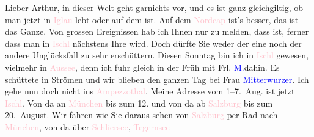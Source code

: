 \pstart
           Lieber Arthur, in dieser Welt geht garnichts vor, und
               es ist ganz gleichgiltig, ob man jetzt in \textcolor{pink}{Iglau}{}\ledrightnote{\textcolor{pink}{Jihlava}}
               lebt oder auf dem \label{K_L03175-1v}\label{K_L03175-1h} ist. Auf dem \textcolor{pink}{Nordcap}{}\ledrightnote{\textcolor{pink}{Nordkap}} ist’s besser, das ist das Ganze. Von
               grossen Ereignissen hab ich Ihnen nur zu melden, dass \label{K_L03175-2v}\label{K_L03175-2h} ist, ferner dass man in \textcolor{pink}{Ischl}{}\ledrightnote{\textcolor{pink}{Bad Ischl}} nächstens Ihre \label{K_L03175-3v}\label{K_L03175-3h} wird. Doch dürfte Sie weder der eine noch der andere Unglücksfall zu sehr
               erschüttern. Diesen Sonntag bin ich in \textcolor{pink}{Ischl}{}\ledrightnote{\textcolor{pink}{Bad Ischl}} gewesen, vielmehr in \textcolor{pink}{Aussee}{}\ledrightnote{\textcolor{pink}{Bad Aussee}}, denn ich fuhr gleich in der Früh mit Frl. \textcolor{blue}{M.}{}\ledrightnote{\textcolor{blue}{Ottilie Salten}}{ }{\pb}dahin. Es schüttete in
               Strömen und wir blieben den ganzen Tag bei Frau \textcolor{blue}{Mitterwurzer}{}\ledrightnote{\textcolor{blue}{Wilhelmine Mitterwurzer}}. Ich gehe nun doch nicht ins \textcolor{pink}{Ampezzothal}{}\ledrightnote{\textcolor{pink}{Valle d’Ampezzo}}. Meine Adresse vom 1–7. Aug. ist jetzt \textcolor{pink}{Ischl}{}\ledrightnote{\textcolor{pink}{Bad Ischl}}. Von da an \textcolor{pink}{München}{}\ledrightnote{\textcolor{pink}{München}} bis zum 12. und von da ab \textcolor{pink}{Salzburg}{}\ledrightnote{\textcolor{pink}{Salzburg}} bis zum 20. August. Wir fahren wie
               Sie daraus sehen von \textcolor{pink}{Salzburg}{}\ledrightnote{\textcolor{pink}{Salzburg}} per Rad nach \textcolor{pink}{München}{}\ledrightnote{\textcolor{pink}{München}}, von da über \textcolor{pink}{Schliersee}{}\ledrightnote{\textcolor{pink}{Schliersee}}, \textcolor{pink}{Tegernsee}{}\ledrightnote{\textcolor{pink}{Tegernsee}}
